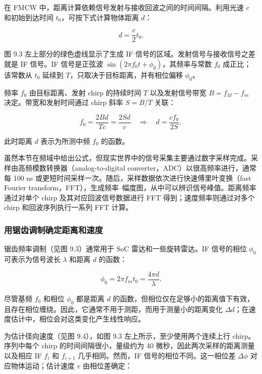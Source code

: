 在 FMCW 中，距离计算依赖信号发射与接收回波之间的时间间隔。利用光速 $c$ 和初始到达时间 $t _ { 0 }$，可按下式计算物体距离 $d$：

\begin{equation}
d = \frac {c}{2} t _ {0 }.\tag{9.1}
\end{equation}

图 9.3 左上部分的绿色虚线显示了生成 IF 信号的区域。发射信号与接收信号之差就是 IF 信号。IF 信号是正弦波 $\sin(2\pi f _ {0} t + \phi _ {0})$，其频率与常数 $f _ { 0 }$ 成正比；该常数从 $t _ { 0 }$ 延续到 $T$，只取决于目标距离，并有相位偏移 $\phi _ { 0 }$。

频率 $f _ { 0 }$ 由目标距离、发射 chirp 的持续时间 $T$ 以及发射信号带宽 $B = f _ { M } - f _ { m }$ 决定。带宽和发射时间通过 chirp 斜率 $S = B / T$ 关联：

\begin{equation}
f _ {0} = \frac {2 B d}{T c} = \frac {2 S d}{c} \quad \Rightarrow \quad d = \frac {c f _ {0}}{2 S},\tag{9.2}
\end{equation}

此时距离 $d$ 表示为所测中频 $f _ { 0 }$ 的函数。

虽然本节在频域中给出公式，但现实世界中的信号采集主要通过数字采样完成。采样由高频模数转换器（analog-to-digital converter，ADC）以很高频率进行，通常每 100 ns 或更短时间采样一次。随后，采样数据依次进行快速傅里叶变换（fast Fourier transform，FFT），生成频率--幅度图，从中可以辨识信号峰值。距离频率通过对单个 chirp 及其对应回波信号数据进行 FFT 得到；速度频率则通过对多个 chirp 和回波序列执行一系列 FFT 计算。

\subsubsection{用锯齿调制确定距离和速度}

锯齿频率调制（见图 9.3）通常用于 SoC 雷达和一些旋转雷达。IF 信号的相位 $\phi _ { 0 }$ 可表示为信号波长 $\lambda$ 和距离 $d$ 的函数：

\begin{equation}
\phi _ {0} = 2 \pi f _ {m} t _ {0} = \frac {4 \pi d}{\lambda}.\tag{9.3}
\end{equation}

尽管基频 $f _ { 0 }$ 和相位 $\phi _ { 0 }$ 都是距离 $d$ 的函数，但相位仅在足够小的距离值下有效，且存在相位缠绕。因此，它通常不用于测距，而用于测量小的距离变化 $\Delta d$；在速度估计中，相位会对这类变化产生线性响应。

为估计径向速度（见图 9.4），如图 9.3 左上所示，至少使用两个连续上行 chirp。序列中每个 chirp 的时间间隔很小，量级约为 40 微秒，因此两次采样的距离测量以及相应 IF $f _ { i }$ 和 $f _ { i+1 }$ 几乎相同。然而，IF 信号的相位不同。这一相位差 $\Delta \phi$ 对应物体运动；估计速度 $v$ 由相位差确定：

